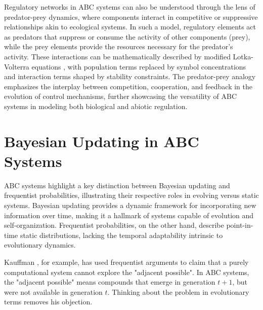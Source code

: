 \documentclass[entropy,article,submit,pdftex,moreauthors]{Definitions/mdpi}
\begin{document}
Regulatory networks in ABC systems can also be understood through the lens of predator-prey dynamics, where components interact in competitive or suppressive relationships akin to ecological systems. In such a model, regulatory elements act as predators that suppress or consume the activity of other components (prey), while the prey elements provide the resources necessary for the predator's activity. These interactions can be mathematically described by modified Lotka-Volterra equations \cite{nowak2006evolutionary}, with population terms replaced by symbol concentrations and interaction terms shaped by stability constraints. The predator-prey analogy emphasizes the interplay between competition, cooperation, and feedback in the evolution of control mechanisms, further showcasing the versatility of ABC systems in modeling both biological and abiotic regulation.


\section{Bayesian Updating in ABC Systems}

ABC systems highlight a key distinction between Bayesian \cite{mcgrayne2011theory} updating and frequentist probabilities, illustrating their respective roles in evolving versus static systems. Bayesian updating provides a dynamic framework for incorporating new information over time, making it a hallmark of systems capable of evolution and self-organization. Frequentist probabilities, on the other hand, describe point-in-time static distributions, lacking the temporal adaptability intrinsic to evolutionary dynamics.

Kauffman \cite{kauffman2000investigations}, for example, has used frequentist arguments to claim that a purely computational system cannot explore the "adjacent possible". In ABC systems, the "adjacent possible" means compounds that emerge in generation \(t+1\), but were not available in generation \(t\). Thinking about the problem in evolutionary terms removes his objection.
\end{document}
